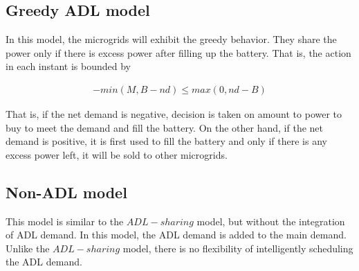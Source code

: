 \subsection{Greedy ADL model}

In this model, the microgrids will exhibit the greedy behavior. They share the power only if there is excess power after filling up the battery. That is, the action in each instant is bounded by   

\begin{align}
-min(M, B - nd) \leq max(0,nd - B) 
\end{align}

That is, if the net demand is negative, decision is taken on amount to power to buy to meet the demand and fill the battery. On the other hand, if the net demand is positive, it is first used to fill the battery and only if there is any excess power left, it will be sold to other microgrids. 

\subsection{Non-ADL model}

This model is similar to the $ADL-sharing$ model, but without the integration of ADL demand. In this model, the ADL demand is added to the main demand. Unlike the $ADL-sharing$ model, there is no flexibility of intelligently scheduling the ADL demand. 
